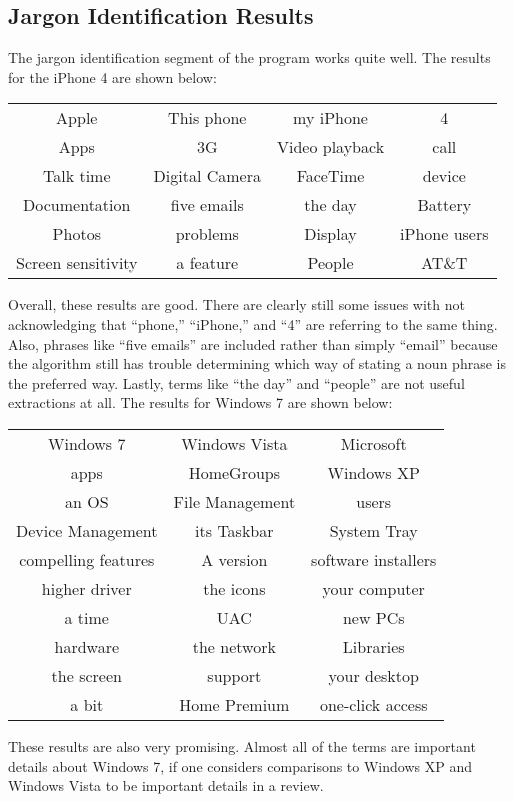 \documentclass{article}
\begin{document}
\subsection{Jargon Identification Results} %

The jargon identification segment of the program works quite well.  The results for the iPhone 4 are shown below:\\\begin{center}\begin{tabular}{cccc}
	Apple&This phone&my iPhone&4\\
	Apps&3G&Video playback&call\\
	Talk time&Digital Camera&FaceTime&device\\
	Documentation&five emails&the day&Battery\\
	Photos&problems&Display&iPhone users\\
	Screen sensitivity&a feature&People&AT\&T
\end{tabular}
\end{center}
Overall, these results are good.  There are clearly still some issues with not acknowledging that ``phone,'' ``iPhone,'' and ``4'' are referring to the same thing.  Also, phrases like ``five emails'' are included rather than simply ``email'' because the algorithm still has trouble determining which way of stating a noun phrase is the preferred way.  Lastly, terms like ``the day'' and ``people'' are not useful extractions at all.
The results for Windows 7 are shown below:\\\begin{center}\begin{tabular}{ccc}
	Windows 7&Windows Vista&Microsoft\\
	apps&HomeGroups&Windows XP\\
	an OS&File Management&users\\
	Device Management&its Taskbar&System Tray\\
	compelling features&A version&software installers\\
	higher driver&the icons&your computer\\
	a time&UAC&new PCs\\
	hardware&the network&Libraries\\
	the screen&support&your desktop\\
	a bit&Home Premium&one-click access
\end{tabular}
\end{center}
These results are also very promising.  Almost all of the terms are important details about Windows 7, if one considers comparisons to Windows XP and Windows Vista to be important details in a review.
\end{document}
